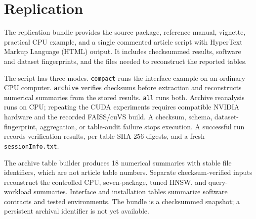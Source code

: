 \documentclass[11pt]{article}
\newcommand{\code}[1]{\texttt{#1}}
\begin{document}
\section{Replication}

The replication bundle provides the source package, reference manual,
vignette, practical CPU example, and a single commented article script with
HyperText Markup Language (HTML) output. It includes checksummed results,
software and dataset fingerprints, and the files needed to reconstruct the
reported tables.

The script has three modes. \code{compact} runs the interface example on an
ordinary CPU computer. \code{archive} verifies checksums before extraction
and reconstructs numerical summaries from the stored results.
\code{all} runs both. Archive reanalysis runs on CPU; repeating the CUDA
experiments requires compatible NVIDIA hardware and the recorded
FAISS/cuVS build. A checksum, schema, dataset-fingerprint, aggregation, or
table-audit failure stops execution. A successful run records verification
results, per-table SHA-256 digests, and a fresh \code{sessionInfo.txt}.

The archive table builder produces 18 numerical summaries with stable file
identifiers, which are not article table numbers. Separate checksum-verified
inputs reconstruct the controlled CPU, seven-package, tuned HNSW, and
query-workload summaries. Interface and installation tables summarize software
contracts and tested environments.
The bundle is a checksummed snapshot; a persistent archival identifier is
not yet available.



\end{document}
